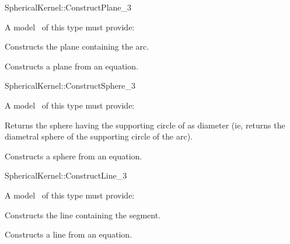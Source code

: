 
\begin{ccRefFunctionObjectConcept}{SphericalKernel::ConstructPlane_3}

\ccRefines


A model \ccVar\ of this type must provide:

{Constructs the plane containing the arc.}

{Constructs a plane from an equation.}

\ccSeeAlso


\end{ccRefFunctionObjectConcept}
\begin{ccRefFunctionObjectConcept}{SphericalKernel::ConstructSphere_3}

\ccRefines


A model \ccVar\ of this type must provide:

{Returns the sphere having the supporting circle of  as
  diameter (ie, returns the diametral sphere of the supporting circle
  of the arc).}

{Constructs a sphere from an equation.}

\ccSeeAlso


\end{ccRefFunctionObjectConcept}
\begin{ccRefFunctionObjectConcept}{SphericalKernel::ConstructLine_3}

\ccRefines


A model \ccVar\ of this type must provide:

{Constructs the line containing the segment.}

{Constructs a line from an equation.}

\ccSeeAlso


\end{ccRefFunctionObjectConcept}
